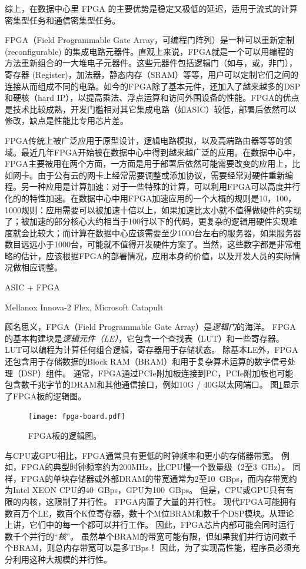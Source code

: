 综上，在数据中心里 FPGA 的主要优势是稳定又极低的延迟，适用于流式的计算密集型任务和通信密集型任务。


FPGA（Field Programmable Gate Array，可编程门阵列）是一种可以重新定制 (reconfigurable) 的集成电路元器件。直观上来说，FPGA就是一个可以用编程的方法重新组合的一大堆电子元器件。这些元器件包括逻辑门（如与，或，非门），寄存器 (Register)，加法器，静态内存（SRAM）等等，用户可以定制它们之间的连接从而组成不同的电路。如今的FPGA除了基本元件，还加入了越来越多的DSP和硬核（hard IP），以提高乘法、浮点运算和访问外围设备的性能。FPGA的优点是技术比较成熟，开发门槛相对其它集成电路（如ASIC）较低，部署后依然可以修改，缺点是性能比专用芯片差。

FPGA传统上被广泛应用于原型设计，逻辑电路模拟，以及高端路由器等等的领域。最近几年FPGA开始被在数据中心中得到越来越广泛的应用。在数据中心中，FPGA主要被用在两个方面，一方面是用于部署后依然可能需要改变的应用上，比如网卡。由于公有云的网卡上经常需要调整或添加协议，需要经常对硬件重新编程。另一种应用是计算加速：对于一些特殊的计算，可以利用FPGA可以高度并行化的的特性加速。在数据中心中用FPGA加速应用的一个大概的规则是10，100，1000规则：应用需要可以被加速十倍以上，如果加速比太小就不值得做硬件的实现了；被加速的部分核心大约相当于100行以下的代码，更复杂的逻辑用硬件实现难度就会比较大；而计算在数据中心应该需要至少1000台左右的服务器，如果服务器数目远远小于1000台，可能就不值得开发硬件方案了。当然，这些数字都是非常粗略的估计，应该根据FPGA的部署情况，应用本身的价值，以及开发人员的实际情况做相应调整。

ASIC + FPGA

Mellanox Innova-2 Flex, Microsoft Catapult


顾名思义，FPGA（Field Programmable Gate Array）是\textit {逻辑门}的海洋。
FPGA的基本构建块是\textit {逻辑元件（LE）}，它包含一个查找表（LUT）和一些寄存器。
LUT可以编程为计算任何组合逻辑，寄存器用于存储状态。
除基本LE外，FPGA还包含用于存储数据的Block RAM（BRAM）和用于复杂算术运算的数字信号处理（DSP）组件。
通常，FPGA通过PCIe附加板连接到PC，PCIe附加板也可能包含数千兆字节的DRAM和其他通信接口，例如10G / 40G以太网端口。
图\ref{clicknp:fig:fpga}显示了FPGA板的逻辑图。

\begin{figure}[t]
	\centering
	\texttt{[image: fpga-board.pdf]}
	
	\caption{FPGA板的逻辑图。}
	\label{clicknp:fig:fpga}
	
\end{figure}


与CPU或GPU相比，FPGA通常具有更低的时钟频率和更小的存储器带宽。
例如，FPGA的典型时钟频率约为200MHz，比CPU慢一个数量级（2至3~GHz）。
同样，FPGA的单块存储器或外部DRAM的带宽通常为2至10~GBps，而内存带宽约为Intel XEON CPU的40~GBps，GPU为100~GBps。
但是，CPU或GPU只有有限的内核，这限制了并行性。 FPGA内置了大量的并行性。
现代FPGA可能拥有数百万个LE，数百个K位寄存器，数十个M位BRAM和数千个DSP模块。从理论上讲，它们中的每一个都可以并行工作。
因此，FPGA芯片内部可能会同时运行数千个并行的``\textit {核}''。
虽然单个BRAM的带宽可能有限，但如果我们并行访问数千个BRAM，则总内存带宽可以是多TBps！
因此，为了实现高性能，程序员必须充分利用这种大规模的并行性。

